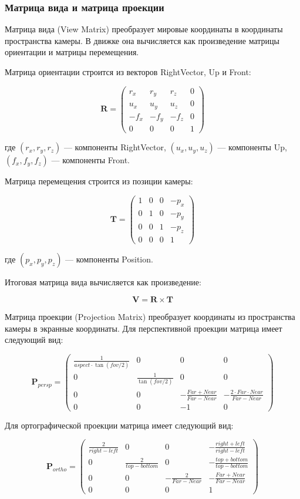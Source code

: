 \subsubsection{Матрица вида и матрица проекции}
Матрица вида (View Matrix) преобразует мировые координаты в координаты пространства камеры. В движке она вычисляется как произведение матрицы ориентации и матрицы перемещения.

Матрица ориентации строится из векторов RightVector, Up и Front:

$$
\mathbf{R} = \begin{pmatrix}
	r_x & r_y & r_z & 0 \\
	u_x & u_y & u_z & 0 \\
	-f_x & -f_y & -f_z & 0 \\
	0 & 0 & 0 & 1
\end{pmatrix}
$$

где $(r_x, r_y, r_z)$ — компоненты RightVector, $(u_x, u_y, u_z)$ — компоненты Up, $(f_x, f_y, f_z)$ — компоненты Front.

Матрица перемещения строится из позиции камеры:

$$
\mathbf{T} = \begin{pmatrix}
	1 & 0 & 0 & -p_x \\
	0 & 1 & 0 & -p_y \\
	0 & 0 & 1 & -p_z \\
	0 & 0 & 0 & 1
\end{pmatrix}
$$

где $(p_x, p_y, p_z)$ — компоненты Position.

Итоговая матрица вида вычисляется как произведение:

$$
\mathbf{V} = \mathbf{R} \times \mathbf{T}
$$

Матрица проекции (Projection Matrix) преобразует координаты из пространства камеры в экранные координаты. Для перспективной проекции матрица имеет следующий вид:

$$
\mathbf{P}_{persp} = \begin{pmatrix}
	\frac{1}{aspect \cdot \tan(fov/2)} & 0 & 0 & 0 \\
	0 & \frac{1}{\tan(fov/2)} & 0 & 0 \\
	0 & 0 & -\frac{Far + Near}{Far - Near} & -\frac{2 \cdot Far \cdot Near}{Far - Near} \\
	0 & 0 & -1 & 0
\end{pmatrix}
$$

Для ортографической проекции матрица имеет следующий вид:

$$
\mathbf{P}_{ortho} = \begin{pmatrix}
	\frac{2}{right - left} & 0 & 0 & -\frac{right + left}{right - left} \\
	0 & \frac{2}{top - bottom} & 0 & -\frac{top + bottom}{top - bottom} \\
	0 & 0 & -\frac{2}{Far - Near} & -\frac{Far + Near}{Far - Near} \\
	0 & 0 & 0 & 1
\end{pmatrix}
$$

